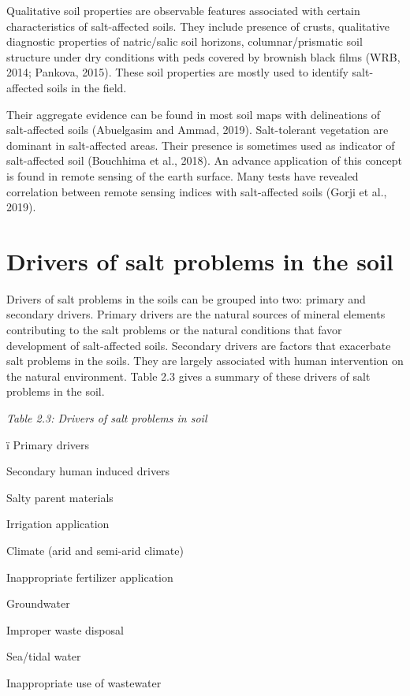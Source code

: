 \documentclass[
  10pt,
  b5paper,
]{book}
\begin{document}
Qualitative soil properties are observable features associated with certain characteristics of salt-affected
soils. They include presence of crusts, qualitative diagnostic properties of natric/salic soil horizons, columnar/prismatic soil structure under dry conditions with peds covered by brownish black films (WRB,
2014; Pankova, 2015). These soil properties are mostly used to identify salt-affected soils in the field.

Their aggregate evidence can be found in most soil maps with delineations of salt-affected soils (Abuelgasim and Ammad, 2019). Salt-tolerant vegetation are dominant in salt-affected areas. Their presence is sometimes used as indicator of salt-affected soil (Bouchhima et al., 2018). An advance application of this concept is found in remote sensing of the earth surface. Many tests have revealed correlation between remote sensing indices with salt-affected soils (Gorji et al., 2019).

\hypertarget{drivers-of-salt-problems-in-the-soil}{%
\section{Drivers of salt problems in the soil}\label{drivers-of-salt-problems-in-the-soil}}

Drivers of salt problems in the soils can be grouped into two: primary and secondary drivers. Primary drivers are the natural sources of mineral elements contributing to the salt problems or the natural conditions that favor development of salt-affected soils. Secondary drivers are factors that exacerbate salt problems in the soils. They are largely associated with human intervention on the natural environment. Table 2.3 gives a summary of these drivers of salt problems in the soil.

\emph{Table 2.3: Drivers of salt problems in soil}

ï Primary drivers

Secondary human induced drivers

Salty parent materials

Irrigation application

Climate (arid and semi-arid climate)

Inappropriate fertilizer application

Groundwater

Improper waste disposal

Sea/tidal water

Inappropriate use of wastewater
\end{document}
